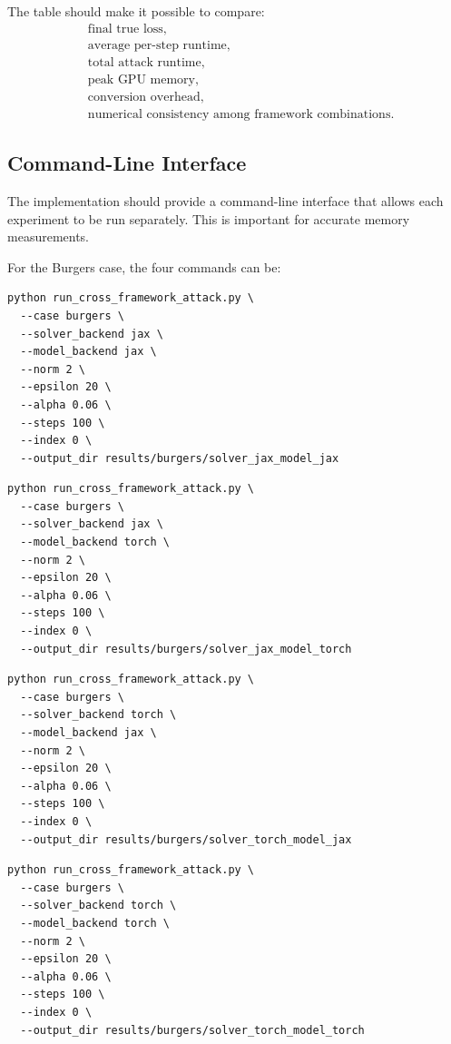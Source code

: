 \documentclass{article}
\begin{document}
The table should make it possible to compare:
\[
\begin{aligned}
&\text{final true loss},\\
&\text{average per-step runtime},\\
&\text{total attack runtime},\\
&\text{peak GPU memory},\\
&\text{conversion overhead},\\
&\text{numerical consistency among framework combinations}.
\end{aligned}
\]

\subsection{Command-Line Interface}

The implementation should provide a command-line interface that allows each experiment to be run separately. This is important for accurate memory measurements.

For the Burgers case, the four commands can be:

\begin{verbatim}
python run_cross_framework_attack.py \
  --case burgers \
  --solver_backend jax \
  --model_backend jax \
  --norm 2 \
  --epsilon 20 \
  --alpha 0.06 \
  --steps 100 \
  --index 0 \
  --output_dir results/burgers/solver_jax_model_jax
\end{verbatim}

\begin{verbatim}
python run_cross_framework_attack.py \
  --case burgers \
  --solver_backend jax \
  --model_backend torch \
  --norm 2 \
  --epsilon 20 \
  --alpha 0.06 \
  --steps 100 \
  --index 0 \
  --output_dir results/burgers/solver_jax_model_torch
\end{verbatim}

\begin{verbatim}
python run_cross_framework_attack.py \
  --case burgers \
  --solver_backend torch \
  --model_backend jax \
  --norm 2 \
  --epsilon 20 \
  --alpha 0.06 \
  --steps 100 \
  --index 0 \
  --output_dir results/burgers/solver_torch_model_jax
\end{verbatim}

\begin{verbatim}
python run_cross_framework_attack.py \
  --case burgers \
  --solver_backend torch \
  --model_backend torch \
  --norm 2 \
  --epsilon 20 \
  --alpha 0.06 \
  --steps 100 \
  --index 0 \
  --output_dir results/burgers/solver_torch_model_torch
\end{verbatim}
\end{document}
